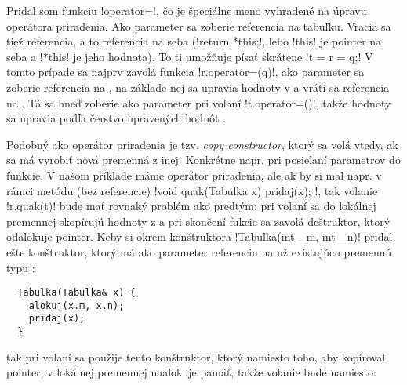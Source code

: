 Pridal som funkciu \prg!operator=!, čo je špeciálne meno vyhradené na úpravu operátora 
priradenia.  Ako parameter sa zoberie referencia na tabuľku. Vracia sa tiež referencia,
a to referencia na seba (\prg!return *this;!, lebo \prg!this! je pointer na seba
a \prg!*this! je jeho hodnota). To ti umožňuje písať skrátene
\prg!t = r = q;! V tomto prípade sa najprv zavolá funkcia \prg!r.operator=(q)!, ako 
parameter sa zoberie referencia na , na základe nej sa upravia hodnoty v 
a vráti sa referencia na . Tá sa hneď zoberie ako parameter pri volaní
\prg!t.operator=()!, takže hodnoty  sa upravia podľa čerstvo upravených hodnôt .

 
 Podobný ako operátor priradenia je tzv. {\em copy constructor}, ktorý sa volá
vtedy, ak sa má vyrobiť nová premenná z inej. Konkrétne napr. pri posielaní parametrov do funkcie.
V našom príklade máme operátor priradenia, ale ak by si mal napr. v rámci 
metódu (bez referencie)
\prg!void quak(Tabulka x) { pridaj(x); }!, tak volanie \prg!r.quak(t)! bude 
mať rovnaký problém ako predtým: pri volaní sa do lokálnej premennej 
skopírujú hodnoty
z  a pri skončení fukcie sa zavolá deštruktor, ktorý odalokuje pointer.
Keby si okrem konštruktora \prg!Tabulka(int _m, int _n)! pridal ešte
konštruktor, ktorý má ako parameter referenciu na už existujúcu premennú typu
:

\begin{lstlisting}
  Tabulka(Tabulka& x) {
    alokuj(x.m, x.n);
    pridaj(x);
  }
\end{lstlisting}

tak pri volaní  sa použije tento konštruktor, ktorý namiesto toho,
aby kopíroval pointer, v lokálnej premennej
 naalokuje pamäť, takže volanie bude namiesto:



